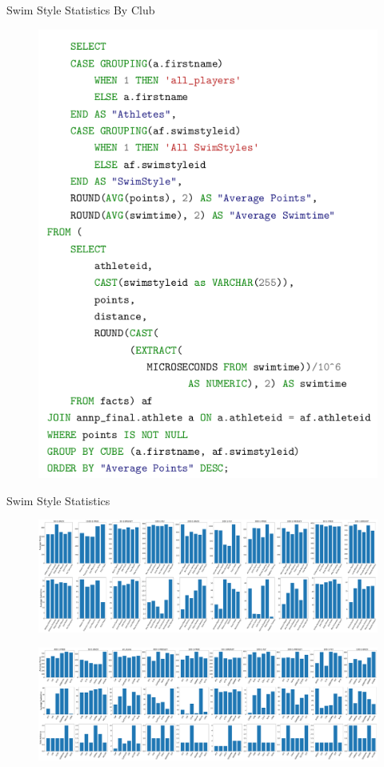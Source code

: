 \documentclass[aspectratio=169, xcolor=dvipsnames]{beamer}
\begin{document}
\begin{frame}{Swim Style Statistics By Club}

\begin{figure}
    \includegraphics[scale=0.25]{img/code.png}
\end{figure}

\end{frame}

\begin{frame}{Swim Style Statistics}
\begin{figure}
    \centering
    \includegraphics[width=\textwidth]{img/stats_athlete_swim.pdf}
\end{figure}

\begin{figure}
    \centering
    \includegraphics[width=\textwidth]{img/stats_clubs_swim.pdf}
\end{figure}

\end{frame}
\end{document}
